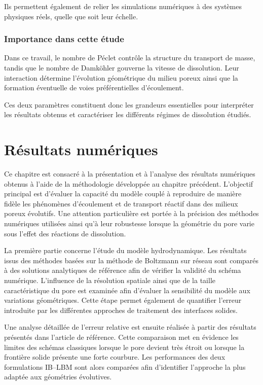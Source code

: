 \documentclass[12pt,a4paper]{report}
\begin{document}
Ils permettent également de relier les simulations numériques à des systèmes physiques réels, quelle que soit leur échelle.

\subsection{Importance dans cette étude}

Dans ce travail, le nombre de Péclet contrôle la structure du transport de masse, tandis que le nombre de Damköhler gouverne la vitesse de dissolution. Leur interaction détermine l’évolution géométrique du milieu poreux ainsi que la formation éventuelle de voies préférentielles d’écoulement.

Ces deux paramètres constituent donc les grandeurs essentielles pour interpréter les résultats obtenus et caractériser les différents régimes de dissolution étudiés.

\chapter{Résultats numériques}
Ce chapitre est consacré à la présentation et à l’analyse des résultats numériques obtenus à l’aide de la méthodologie développée au chapitre précédent. L’objectif principal est d’évaluer la capacité du modèle couplé à reproduire de manière fidèle les phénomènes d’écoulement et de transport réactif dans des milieux poreux évolutifs. Une attention particulière est portée à la précision des méthodes numériques utilisées ainsi qu’à leur robustesse lorsque la géométrie du pore varie sous l’effet des réactions de dissolution.

La première partie concerne l’étude du modèle hydrodynamique. Les résultats issus des méthodes basées sur la méthode de Boltzmann sur réseau sont comparés à des solutions analytiques de référence afin de vérifier la validité du schéma numérique. L’influence de la résolution spatiale ainsi que de la taille caractéristique du pore est examinée afin d’évaluer la sensibilité du modèle aux variations géométriques. Cette étape permet également de quantifier l’erreur introduite par les différentes approches de traitement des interfaces solides.

Une analyse détaillée de l’erreur relative est ensuite réalisée à partir des résultats présentés dans l’article de référence. Cette comparaison met en évidence les limites des schémas classiques lorsque le pore devient très étroit ou lorsque la frontière solide présente une forte courbure. Les performances des deux formulations IB–LBM sont alors comparées afin d’identifier l’approche la plus adaptée aux géométries évolutives.
\end{document}
